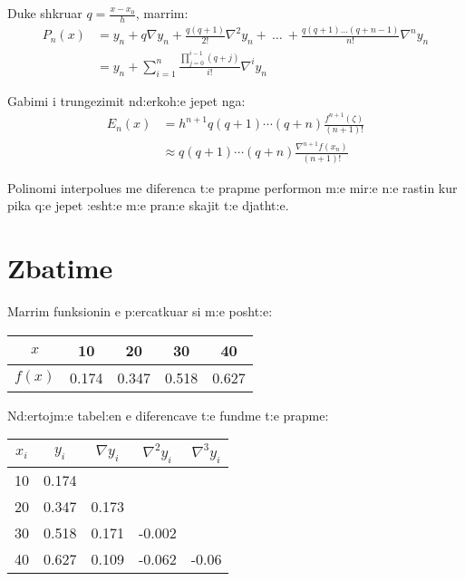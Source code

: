 \documentclass[12pt, margin=1in, a4paper]{article}
\begin{document}
  Duke shkruar \(q = \frac{x - x_0}{h}\), marrim:
  \begin{equation}
  \begin{aligned}
    P_n(x) &= y_n + q\nabla y_n + \frac{q(q + 1)}{2!}\nabla^2y_n + \ \dots \ + \frac{q(q + 1)\dots(q + n - 1)}{n!}\nabla^n y_n \\
    &= y_n + \sum_{i = 1}^n{\frac{\prod_{j = 0}^{i - 1}{(q + j)}}{i!}\nabla^iy_n}
  \end{aligned}
  \end{equation}

  Gabimi i trungezimit nd:erkoh:e jepet nga:
  \begin{equation}
  \begin{aligned}
    E_n(x) &= h^{n + 1}q(q + 1) \cdots (q + n)\frac{f^{n + 1}(\zeta)}{(n + 1)!} \\
    &\approx q(q + 1) \cdots (q + n)\frac{\nabla^{n + 1}f(x_n)}{(n + 1)!}
  \end{aligned}
  \end{equation}

  Polinomi interpolues me diferenca t:e prapme performon m:e mir:e n:e rastin
  kur pika q:e jepet :esht:e m:e pran:e skajit t:e djatht:e.

  \newpage

\section{Zbatime}
  Marrim funksionin e p:ercatkuar si m:e posht:e:
  \begin{tabular}{|c|c|c|c|c|}
    \hline
    \(x\) & 10 & 20 & 30 & 40 \\
    \hline
    \(f(x)\) & 0.174 & 0.347 & 0.518 & 0.627 \\
    \hline
  \end{tabular}

  Nd:ertojm:e tabel:en e diferencave t:e fundme t:e prapme:
  \begin{tabular}{|c|c|c|c|c|}
    \hline
    \(x_i\) & \(y_i\) & \(\nabla y_i\) & \(\nabla^2y_i\) & \(\nabla^3y_i\) \\
    \hline
    10 & 0.174 & & & \\
    \hline
    20 & 0.347 & 0.173 & & \\
    \hline
    30 & 0.518 & 0.171 & -0.002 & \\
    \hline
    40 & 0.627 & 0.109 & -0.062 & -0.06 \\
    \hline
  \end{tabular}
\end{document}
